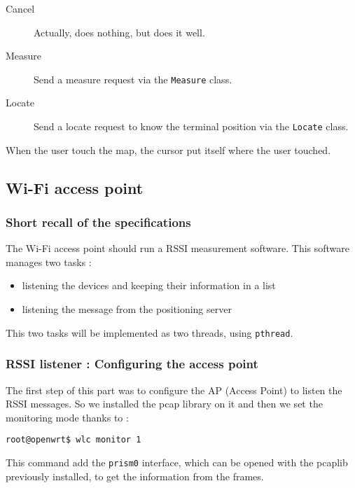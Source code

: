 \begin{description}
    \item[Cancel] Actually, does nothing, but does it well.
    \item[Measure] Send a measure request via the \verb+Measure+ class.
    \item[Locate] Send a locate request to know the terminal position via the
        \verb+Locate+ class.
\end{description}

When the user touch the map, the cursor put itself where the user touched.

\newpage
\subsection{Wi-Fi access point}

\subsubsection{Short recall of the specifications}

The Wi-Fi access point should run a RSSI measurement software. This software
manages two tasks :

\begin{itemize}
    \item listening the devices and keeping their information in a list
    \item listening the message from the positioning server
\end{itemize}

This two tasks will be implemented as two threads, using \verb+pthread+.

\subsubsection{RSSI listener : Configuring the access point}

The first step of this part was to configure the AP (Access Point) to listen
the RSSI messages. So we installed the pcap library on it and then we set the
monitoring mode thanks to :

\begin{verbatim}
root@openwrt$ wlc monitor 1
\end{verbatim}

This command add the \verb+prism0+ interface, which can be opened with the
pcaplib previously installed, to get the information from the frames.

